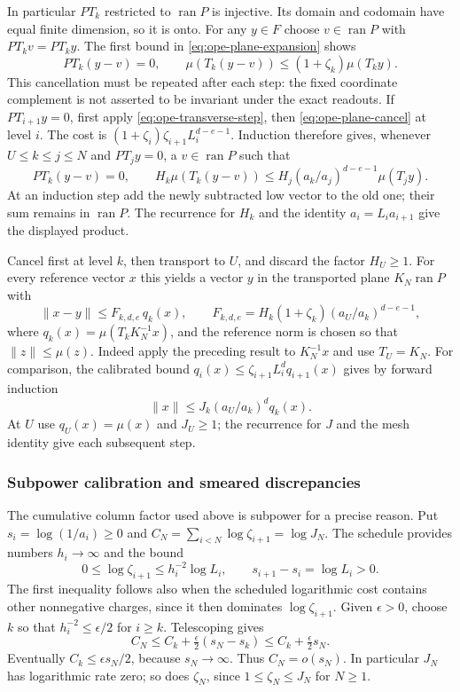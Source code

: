 In particular $PT_k$ restricted to $\operatorname{ran}P$ is injective.
Its domain and codomain have equal finite dimension, so it is onto.
For any $y\in F$ choose $v\in\operatorname{ran}P$ with
$PT_kv=PT_ky$. The first bound in \eqref{eq:ope-plane-expansion} shows
\begin{equation}\label{eq:ope-plane-cancel}
 PT_k(y-v)=0,\qquad
 \mu(T_k(y-v))\leq(1+\zeta_k)\mu(T_ky).
\end{equation}
This cancellation must be repeated after each step: the fixed coordinate
complement is not asserted to be invariant under the exact readouts.
If $PT_{i+1}y=0$, first apply \eqref{eq:ope-transverse-step}, then
\eqref{eq:ope-plane-cancel} at level $i$. The cost is
$(1+\zeta_i)\zeta_{i+1}L_i^{d-e-1}$.
Induction therefore gives, whenever $U\leq k\leq j\leq N$ and
$PT_jy=0$, a $v\in\operatorname{ran}P$ such that
\[
 PT_k(y-v)=0,\qquad
 H_k\mu(T_k(y-v))\leq
 H_j(a_k/a_j)^{d-e-1}\mu(T_jy).
\]
At an induction step add the newly subtracted low vector to the old
one; their sum remains in $\operatorname{ran}P$. The recurrence for
$H_k$ and the identity $a_i=L_ia_{i+1}$ give the displayed product.

Cancel first at level $k$, then transport to $U$, and discard the
factor $H_U\geq1$. For every reference vector $x$ this yields a vector
$y$ in the transported plane $K_N\operatorname{ran}P$ with
\begin{equation}\label{eq:ope-transport-distance}
 \|x-y\|\leq F_{k,d,e}\,q_k(x),\qquad
 F_{k,d,e}=H_k(1+\zeta_k)(a_U/a_k)^{d-e-1},
\end{equation}
where $q_k(x)=\mu(T_kK_N^{-1}x)$, and the reference norm is chosen so
that $\|z\|\leq\mu(z)$. Indeed apply the preceding result to
$K_N^{-1}x$ and use $T_U=K_N$.
For comparison, the calibrated bound
$q_i(x)\leq\zeta_{i+1}L_i^d q_{i+1}(x)$ gives by forward induction
\begin{equation}\label{eq:ope-whole-distance}
 \|x\|\leq J_k(a_U/a_k)^d q_k(x).
\end{equation}
At $U$ use $q_U(x)=\mu(x)$ and $J_U\geq1$; the recurrence for $J$
and the mesh identity give each subsequent step.

\subsubsection{Subpower calibration and smeared discrepancies}
\label{ex-column-subpower}
The cumulative column factor used above is subpower for a precise
reason. Put $s_i=\log(1/a_i)\geq0$ and
$C_N=\sum_{i<N}\log\zeta_{i+1}=\log J_N$.
The schedule provides numbers $h_i\to\infty$ and the bound
\[
 0\leq\log\zeta_{i+1}\leq h_i^{-2}\log L_i,
 \qquad s_{i+1}-s_i=\log L_i>0.
\]
The first inequality follows also when the scheduled logarithmic cost
contains other nonnegative charges, since it then dominates
$\log\zeta_{i+1}$. Given $\epsilon>0$, choose $k$ so that
$h_i^{-2}\leq\epsilon/2$ for $i\geq k$. Telescoping gives
\[
 C_N\leq C_k+\tfrac\epsilon2(s_N-s_k)\leq C_k+\tfrac\epsilon2s_N.
\]
Eventually $C_k\leq\epsilon s_N/2$, because $s_N\to\infty$.
Thus $C_N=o(s_N)$. In particular $J_N$ has logarithmic rate zero;
so does $\zeta_N$, since $1\leq\zeta_N\leq J_N$ for $N\geq1$.

